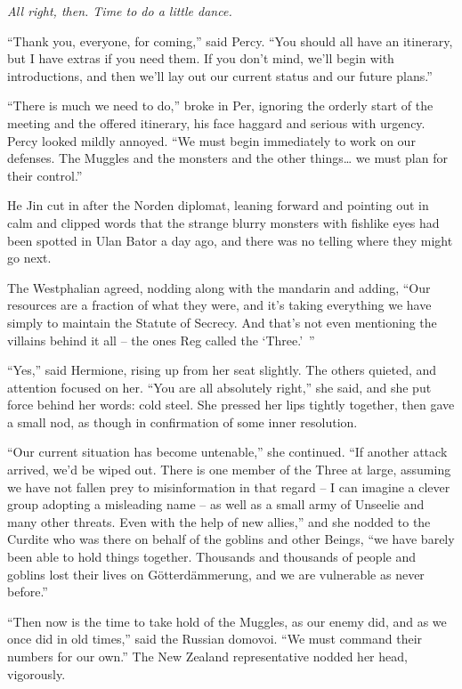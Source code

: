 \emph{All right, then. Time to do a little dance.}

``Thank you, everyone, for coming,'' said Percy. ``You should all have
an itinerary, but I have extras if you need them. If you don't mind,
we'll begin with introductions, and then we'll lay out our current
status and our future plans.''

``There is much we need to do,'' broke in Per, ignoring the orderly
start of the meeting and the offered itinerary, his face haggard and
serious with urgency. Percy looked mildly annoyed. ``We must begin
immediately to work on our defenses. The Muggles and the monsters and
the other things\ldots{} we must plan for their control.''

He Jin cut in after the Norden diplomat, leaning forward and pointing
out in calm and clipped words that the strange blurry monsters with
fishlike eyes had been spotted in Ulan Bator a day ago, and there was no
telling where they might go next.

The Westphalian agreed, nodding along with the mandarin and adding,
``Our resources are a fraction of what they were, and it's taking
everything we have simply to maintain the Statute of Secrecy. And that's
not even mentioning the villains behind it all -- the ones Reg called
the `Three.'~''

``Yes,'' said Hermione, rising up from her seat slightly. The others
quieted, and attention focused on her. ``You are all absolutely right,''
she said, and she put force behind her words: cold steel. She pressed
her lips tightly together, then gave a small nod, as though in
confirmation of some inner resolution.

``Our current situation has become untenable,'' she continued. ``If
another attack arrived, we'd be wiped out. There is one member of the
Three at large, assuming we have not fallen prey to misinformation in
that regard -- I can imagine a clever group adopting a misleading name
-- as well as a small army of Unseelie and many other threats. Even with
the help of new allies,'' and she nodded to the Curdite who was there on
behalf of the goblins and other Beings, ``we have barely been able to
hold things together. Thousands and thousands of people and goblins lost
their lives on Götterdämmerung, and we are vulnerable as never before.''

``Then now is the time to take hold of the Muggles, as our enemy did,
and as we once did in old times,'' said the Russian domovoi. ``We must
command their numbers for our own.'' The New Zealand representative
nodded her head, vigorously.

